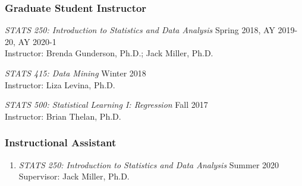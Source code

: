 \documentclass[letterpaper,11pt]{article} %
\begin{document}
		\subsubsection*{Graduate Student Instructor}
		\begin{etaremune}
			\item \textit{STATS 250: Introduction to Statistics and Data Analysis} \hfill Spring 2018, AY 2019-20, AY 2020-1 \\
			Instructor: Brenda Gunderson, Ph.D.; Jack Miller, Ph.D.
			
			\item \textit{STATS 415: Data Mining} \hfill Winter 2018 \\
			Instructor: Liza Levina, Ph.D. 
			
			\item \textit{STATS 500: Statistical Learning I: Regression} \hfill Fall 2017 \\
			Instructor: Brian Thelan, Ph.D.
		\end{etaremune}
	
	   \subsubsection*{Instructional Assistant}
    	\begin{enumerate}
    		\item \textit{STATS 250: Introduction to Statistics and Data Analysis} \hfill Summer 2020 \\
    		Supervisor: Jack Miller, Ph.D.
    	\end{enumerate}
    
\end{document}
